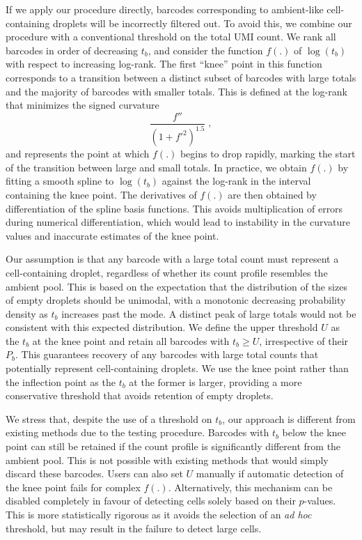 \documentclass[10pt,letterpaper]{article}
\begin{document}
If we apply our procedure directly, barcodes corresponding to ambient-like cell-containing droplets will be incorrectly filtered out.
To avoid this, we combine our procedure with a conventional threshold on the total UMI count.
We rank all barcodes in order of decreasing $t_b$, and consider the function $f(.)$ of $\log(t_b)$ with respect to increasing log-rank.
The first ``knee'' point in this function corresponds to a transition between a distinct subset of barcodes with large totals and the majority of barcodes with smaller totals.
This is defined at the log-rank that minimizes the signed curvature
\[
    \frac{f''}{(1 + f'^2)^{1.5}} \;,
\]
and represents the point at which $f(.)$ begins to drop rapidly, marking the start of the transition between large and small totals.
In practice, we obtain $f(.)$ by fitting a smooth spline to $\log(t_b)$ against the log-rank in the interval containing the knee point.
The derivatives of $f(.)$ are then obtained by differentiation of the spline basis functions.
This avoids multiplication of errors during numerical differentiation, which would lead to instability in the curvature values and inaccurate estimates of the knee point.

Our assumption is that any barcode with a large total count must represent a cell-containing droplet, regardless of whether its count profile resembles the ambient pool.
This is based on the expectation that the distribution of the sizes of empty droplets should be unimodal, with a monotonic decreasing probability density as $t_b$ increases past the mode.
A distinct peak of large totals would not be consistent with this expected distribution.
We define the upper threshold $U$ as the $t_b$ at the knee point and retain all barcodes with $t_b \ge U$, irrespective of their $P_b$.
This guarantees recovery of any barcodes with large total counts that potentially represent cell-containing droplets. 
We use the knee point rather than the inflection point as the $t_b$ at the former is larger, providing a more conservative threshold that avoids retention of empty droplets.

We stress that, despite the use of a threshold on $t_b$, our approach is different from existing methods due to the testing procedure.
Barcodes with $t_b$ below the knee point can still be retained if the count profile is significantly different from the ambient pool.
This is not possible with existing methods that would simply discard these barcodes.
Users can also set $U$ manually if automatic detection of the knee point fails for complex $f(.)$.
Alternatively, this mechanism can be disabled completely in favour of detecting cells solely based on their $p$-values.
This is more statistically rigorous as it avoids the selection of an \textit{ad hoc} threshold, but may result in the failure to detect large cells.
\end{document}
